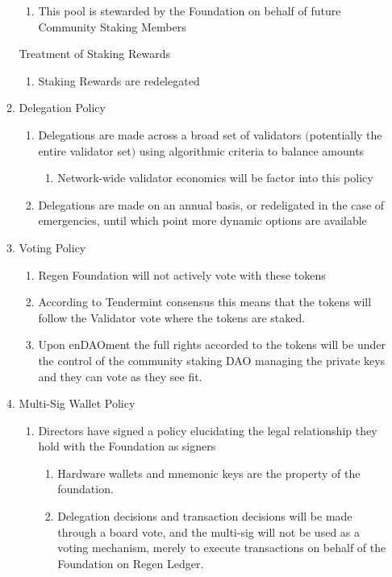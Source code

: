 \documentclass{article}
\begin{document}
\begin{enumerate}
\begin{enumerate}
\begin{enumerate}
\item This pool is stewarded by the Foundation on behalf of future Community Staking Members
\end{enumerate}
Treatment of Staking Rewards
\begin{enumerate}
\item Staking Rewards are redelegated
\end{enumerate}
\item Delegation Policy
\begin{enumerate}
\item Delegations are made across a broad set of validators $($potentially the entire validator set$)$ using algorithmic criteria to balance amounts
\begin{enumerate}
\item Network-wide validator economics will be factor into this policy
\end{enumerate}
\item Delegations are made on an annual basis, or redeligated in the case of emergencies, until which point more dynamic options are available
\end{enumerate}
\item Voting Policy
\begin{enumerate}
\item Regen Foundation will not actively vote with these tokens
\item According to Tendermint consensus this means that the tokens will follow the Validator vote where the tokens are staked.  
\item Upon enDAOment the full rights accorded to the tokens will be under the control of the community staking DAO managing the private keys and they can vote as they see fit.
\end{enumerate}
\item Multi-Sig Wallet Policy
\begin{enumerate}
\item Directors have signed a policy elucidating the legal relationship they hold with the Foundation as signers
\begin{enumerate}
\item Hardware wallets and mnemonic keys are the property of the foundation.
\item Delegation decisions and transaction decisions will be made through a board vote, and the multi-sig will not be used as a voting mechanism, merely to execute transactions on behalf of the Foundation on Regen Ledger.

\end{enumerate}
\end{enumerate}
\end{enumerate}
\end{enumerate}
\end{document}
